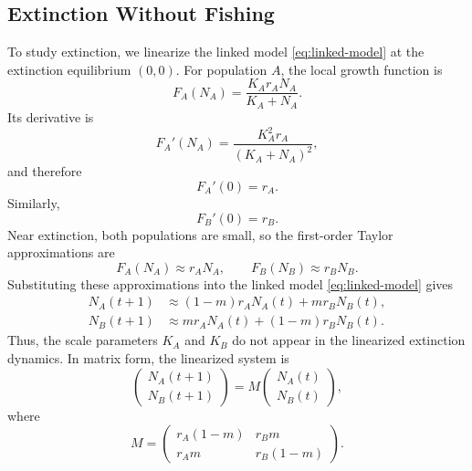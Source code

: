 \documentclass{article}
\numberwithin{equation}{section}
\begin{document}
\subsection{Extinction Without Fishing}
To study extinction, we linearize the linked model \eqref{eq:linked-model}
at the extinction equilibrium $(0,0)$. For population $A$, the local
growth function is
\begin{equation*}
    F_A(N_A)=\frac{K_A r_A N_A}{K_A+N_A}.
\end{equation*}
Its derivative is
\begin{equation*}
    F_A'(N_A)=\frac{K_A^2 r_A}{(K_A+N_A)^2},
\end{equation*}
and therefore
\begin{equation*}
    F_A'(0)=r_A.
\end{equation*}
Similarly,
\begin{equation*}
    F_B'(0)=r_B.
\end{equation*}
Near extinction, both populations are small, so the first-order Taylor
approximations are
\begin{equation*}
    F_A(N_A)\approx r_A N_A,
    \qquad
    F_B(N_B)\approx r_B N_B.
\end{equation*}
Substituting these approximations into the linked model
\eqref{eq:linked-model} gives
\begin{equation*}
    \begin{aligned}
        N_A(t+1)
            &\approx (1-m)r_A N_A(t)+mr_BN_B(t),\\
        N_B(t+1)
            &\approx mr_A N_A(t)+(1-m)r_BN_B(t).
    \end{aligned}
\end{equation*}
Thus, the scale parameters $K_A$ and $K_B$ do not appear in the
linearized extinction dynamics. In matrix form, the linearized system is
\begin{equation*}
    \begin{pmatrix}
        N_A(t+1)\\
        N_B(t+1)
    \end{pmatrix}
    =
    M
    \begin{pmatrix}
        N_A(t)\\
        N_B(t)
    \end{pmatrix},
\end{equation*}
where
\begin{equation}
    \label{eq:linked-linear-matrix}
    M=
    \begin{pmatrix}
        r_A(1-m) & r_Bm\\
        r_Am & r_B(1-m)
    \end{pmatrix}.
\end{equation}
\end{document}
